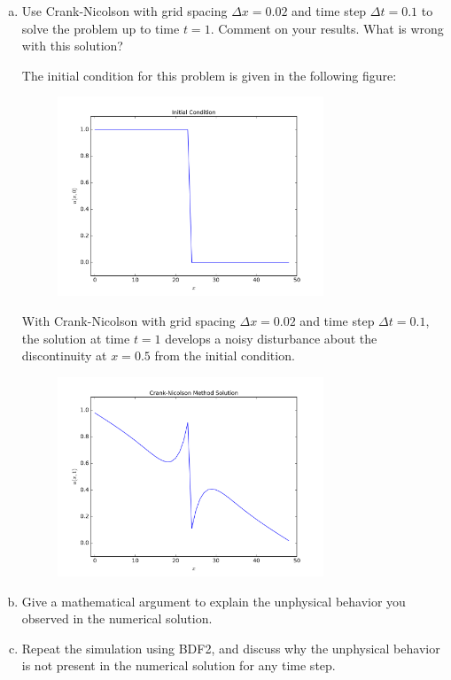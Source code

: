 \documentclass[12pt]{article}
\begin{document}
\begin{enumerate}[(a)]
\item Use Crank-Nicolson with grid spacing $\Delta x = 0.02$ and time step $\Delta t = 0.1$ to solve the problem up to time $t=1$. Comment on your results.  What is wrong with this solution?

The initial condition for this problem is given in the following figure:
\begin{figure}[H]
\centering\includegraphics[width=0.75\textwidth]{problem3_initial_condition.png}
\end{figure}

With Crank-Nicolson with grid spacing $\Delta x = 0.02$ and time step $\Delta t = 0.1$, the solution at time $t=1$ develops a noisy disturbance about the discontinuity at $x=0.5$ from the initial condition.

\begin{figure}[H]
\centering\includegraphics[width=0.75\textwidth]{problem3_crank_nicolson_issue.png}
\end{figure}

\item Give a mathematical argument to explain the unphysical behavior you observed in the numerical solution.

\item Repeat the simulation using BDF2, and discuss why the unphysical behavior is not present in the numerical solution for any time step.
\end{enumerate}
\end{document}
